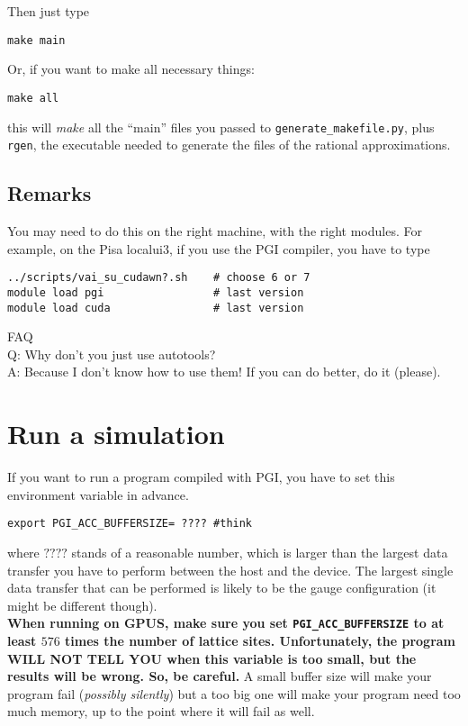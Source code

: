Then just  type

\begin{verbatim}
make main
\end{verbatim}
Or, if you want to make all necessary things:
\begin{verbatim}
make all
\end{verbatim}
this will \emph{make} all the ``main'' files you passed to 
\verb|generate_makefile.py|, plus \verb|rgen|, the executable needed to 
generate the files of the rational approximations. 

\subsection{Remarks} 
You may need to do this on the right machine, with the right modules.
For example, on the Pisa localui3, if you use the PGI compiler,
you have to type
\begin{verbatim}
../scripts/vai_su_cudawn?.sh    # choose 6 or 7
module load pgi                 # last version
module load cuda                # last version
\end{verbatim}




FAQ \\
Q: Why don't you just use autotools? \\
A: Because I don't know how to use them! If you can do better, do
it (please).



\section{Run a simulation}

If you want to run a program compiled with PGI, you have to set this 
environment variable in advance.
\begin{verbatim}
export PGI_ACC_BUFFERSIZE= ???? #think
\end{verbatim}
where $????$ stands of a reasonable number, which is larger than the largest 
data transfer you have to perform between the host and the device. The largest 
single data transfer that can be performed is likely to be the gauge 
configuration (it might be different though). \\
{ \bf When running on GPUS, make sure you set \verb|PGI_ACC_BUFFERSIZE| to at 
    least $576$ times the number of lattice sites. Unfortunately, the program WILL 
    NOT TELL YOU when this variable is too small, but the results will be wrong. 
So, be careful.}
A small buffer size will make your program fail (\emph{possibly silently}) 
but a too big one will make your program need too much memory, up to the point 
where it will fail as well.


